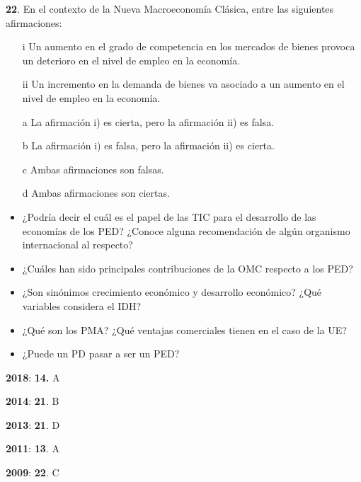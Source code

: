 \documentclass{nuevotema}
\begin{document}
\textbf{22}. En el contexto de la Nueva Macroeconomía Clásica, entre las siguientes afirmaciones: 

\begin{enumerate}
	\item[i] Un aumento en el grado de competencia en los mercados de bienes provoca un deterioro en el nivel de empleo en la economía.
	\item[ii] Un incremento en la demanda de bienes va asociado a un aumento en el nivel de empleo en la economía.
\end{enumerate}

\begin{enumerate}
	\item[a] La afirmación i) es cierta, pero la afirmación ii) es falsa.
	\item[b] La afirmación i) es falsa, pero la afirmación ii) es cierta.
	\item[c] Ambas afirmaciones son falsas.
	\item[d] Ambas afirmaciones son ciertas.
\end{enumerate}


\begin{itemize}
    \item ¿Podría decir el cuál es el papel de las TIC para el desarrollo de las economías de los PED? ¿Conoce alguna recomendación de algún organismo internacional al respecto?

    \item ¿Cuáles han sido principales contribuciones de la OMC respecto a los PED?

    \item ¿Son sinónimos crecimiento económico y desarrollo económico? ¿Qué variables considera el IDH?

    \item ¿Qué son los PMA? ¿Qué ventajas comerciales tienen en el caso de la UE?

    \item ¿Puede un PD pasar a ser un PED?
\end{itemize}

\notas

\textbf{2018}: \textbf{14.} A

\textbf{2014}: \textbf{21}. B

\textbf{2013}: \textbf{21}. D

\textbf{2011}: \textbf{13}. A

\textbf{2009}: \textbf{22}. C
\end{document}
